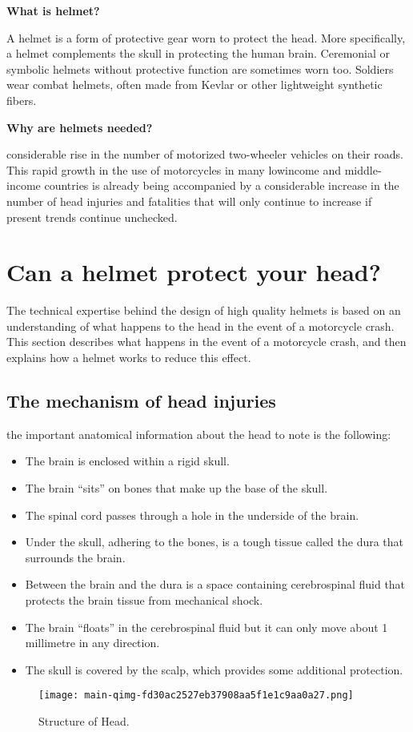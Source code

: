 \textbf{What is helmet?}
\vspace{.2cm}

A helmet is a form of protective gear worn to protect the head. More specifically, a helmet complements
the skull in protecting the human brain. Ceremonial or symbolic helmets without protective function
are sometimes worn too. Soldiers wear combat helmets, often made from Kevlar or other lightweight
synthetic fibers.
\vspace{.5cm}

\textbf{Why are helmets needed?}
\vspace{.2cm}

considerable rise in the number of motorized two-wheeler vehicles on their roads. This rapid growth in
the use of motorcycles in many lowincome and middle-income countries is already being accompanied by
a considerable increase in the number of head injuries and fatalities that will only continue to increase
if present trends continue unchecked.

\section{Can a helmet protect your head?}
The technical expertise behind the design of high quality helmets is based on an understanding of
what happens to the head in the event of a motorcycle crash. This section describes what happens in
the event of a motorcycle crash, and then explains how a helmet works to reduce this effect.

\subsection{The mechanism of head injuries}
the important anatomical information about the head to note is the following:
\begin{itemize}
	\item The brain is enclosed within a rigid skull.
	\item The brain “sits” on bones that make up the base of the skull.
	\item The spinal cord passes through a hole in the underside of the brain.
	\item Under the skull, adhering to the bones, is a tough tissue called the dura that surrounds the brain.
	\item Between the brain and the dura is a space containing cerebrospinal fluid that protects the brain tissue
	from mechanical shock.
	\item The brain “floats” in the cerebrospinal fluid but it can only move about 1 millimetre in any direction.
	\item The skull is covered by the scalp, which provides some additional protection.
\end{itemize}
\begin{figure}[h]
	\centering
	\texttt{[image: main-qimg-fd30ac2527eb37908aa5f1e1c9aa0a27.png]}
	\caption{Structure of Head.}
\end{figure}


